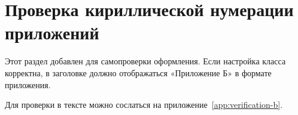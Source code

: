 \section{Проверка кириллической нумерации приложений}

Этот раздел добавлен для самопроверки оформления.
Если настройка класса корректна, в заголовке должно отображаться
«Приложение Б» в формате приложения.

Для проверки в тексте можно сослаться на приложение~\ref{app:verification-b}.

\label{app:verification-b}
